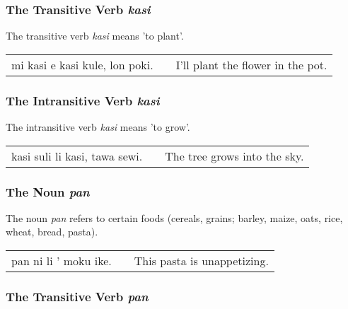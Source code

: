 \subsubsection*{The Transitive Verb \textit{kasi}}
%
%
The transitive verb \textit{kasi} means 'to plant'.

\begin{supertabular}{p{5,5cm}|ll}
mi kasi e kasi kule, lon poki. && I'll plant the flower in the pot. \\
\end{supertabular} 

%
%
\subsubsection*{The Intransitive Verb \textit{kasi}}
%
%
The intransitive verb \textit{kasi} means 'to grow'.

\begin{supertabular}{p{5,5cm}|ll}
kasi suli li kasi, tawa sewi. && The tree grows into the sky. \\
\end{supertabular}  

%
%
\subsubsection*{The Noun \textit{pan}}
%

The noun \textit{pan} refers to certain foods (cereals, grains; barley, maize, oats, rice, wheat, bread, pasta). 

\begin{supertabular}{p{5,5cm}|ll}
pan ni li ' moku ike. && This pasta is unappetizing. \\
\end{supertabular} 

%
%
\subsubsection*{The Transitive Verb \textit{pan}}
%

